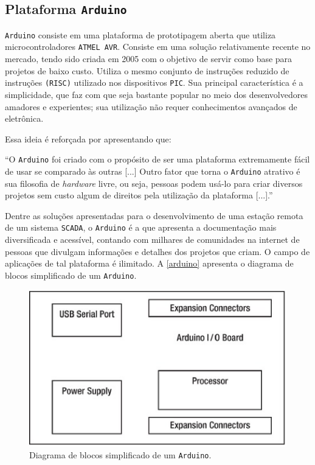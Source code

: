 \subsection{Plataforma \texttt{Arduino}}
\label{due}

\texttt{Arduino} consiste em uma plataforma de prototipagem aberta que utiliza microcontroladores \texttt{ATMEL AVR}. Consiste em uma solução relativamente recente no mercado, tendo sido criada em 2005 com o objetivo de servir como base para projetos de baixo custo. Utiliza o mesmo conjunto de instruções reduzido de instruções \texttt{(RISC)} utilizado nos dispositivos \texttt{PIC}. Sua principal característica é a simplicidade, que faz com que seja bastante popular no meio dos desenvolvedores amadores e experientes; sua utilização não requer conhecimentos avançados de eletrônica.

Essa ideia é reforçada por \cite[p.~3]{vasiljevic2013} apresentando que:

\begin{citacao}
``O \texttt{Arduino} foi criado com o propósito de ser uma plataforma extremamente fácil de
usar se comparado às outras [...] Outro fator que torna o \texttt{Arduino} atrativo é sua
filosofia de \textit{hardware} livre, ou seja, pessoas podem usá-lo para criar diversos projetos
sem custo algum de direitos pela utilização da plataforma [...].''
\end{citacao}

Dentre as soluções apresentadas para o desenvolvimento de uma estação remota de um sistema \texttt{SCADA}, o \texttt{Arduino} é a que apresenta a documentação mais diversificada e acessível, contando com milhares de comunidades na internet de pessoas que divulgam informações e detalhes dos projetos que criam. O campo de aplicações de tal plataforma é ilimitado. A \autoref{arduino} apresenta o diagrama de blocos simplificado de um \texttt{Arduino}.


\begin{figure}[h]
	\centering
	\caption{\label{arduino}Diagrama de blocos simplificado de um \texttt{Arduino}.}
		\includegraphics[keepaspectratio=true,scale=1]{figuras/arduino.eps}
\end{figure}

